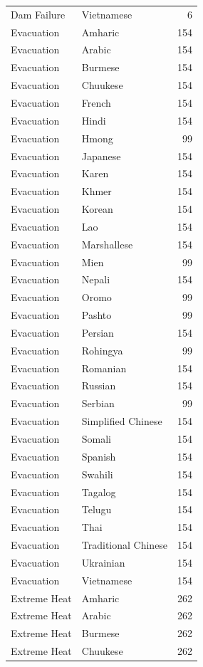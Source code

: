 \begin{longtable}{p{3cm} p{3cm} r}
Dam Failure & Vietnamese & 6 \\
Evacuation & Amharic & 154 \\
Evacuation & Arabic & 154 \\
Evacuation & Burmese & 154 \\
Evacuation & Chuukese & 154 \\
Evacuation & French & 154 \\
Evacuation & Hindi & 154 \\
Evacuation & Hmong & 99 \\
Evacuation & Japanese & 154 \\
Evacuation & Karen & 154 \\
Evacuation & Khmer & 154 \\
Evacuation & Korean & 154 \\
Evacuation & Lao & 154 \\
Evacuation & Marshallese & 154 \\
Evacuation & Mien & 99 \\
Evacuation & Nepali & 154 \\
Evacuation & Oromo & 99 \\
Evacuation & Pashto & 99 \\
Evacuation & Persian & 154 \\
Evacuation & Rohingya & 99 \\
Evacuation & Romanian & 154 \\
Evacuation & Russian & 154 \\
Evacuation & Serbian & 99 \\
Evacuation & Simplified Chinese & 154 \\
Evacuation & Somali & 154 \\
Evacuation & Spanish & 154 \\
Evacuation & Swahili & 154 \\
Evacuation & Tagalog & 154 \\
Evacuation & Telugu & 154 \\
Evacuation & Thai & 154 \\
Evacuation & Traditional Chinese & 154 \\
Evacuation & Ukrainian & 154 \\
Evacuation & Vietnamese & 154 \\
Extreme Heat & Amharic & 262 \\
Extreme Heat & Arabic & 262 \\
Extreme Heat & Burmese & 262 \\
Extreme Heat & Chuukese & 262 \\

\end{longtable}
